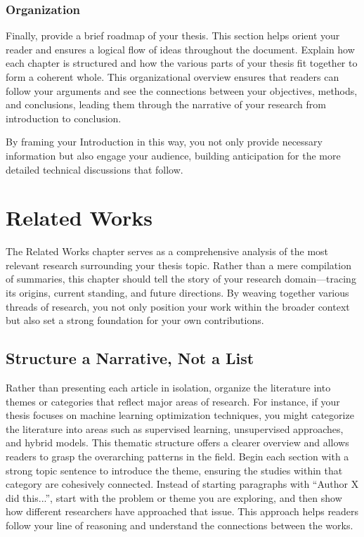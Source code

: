 \documentclass{iutbscthesis}
\begin{document}
\subsection{Organization}
Finally, provide a brief roadmap of your thesis. This section helps orient your reader and ensures a logical flow of ideas throughout the document. Explain how each chapter is structured and how the various parts of your thesis fit together to form a coherent whole. This organizational overview ensures that readers can follow your arguments and see the connections between your objectives, methods, and conclusions, leading them through the narrative of your research from introduction to conclusion.


By framing your Introduction in this way, you not only provide necessary information but also engage your audience, building anticipation for the more detailed technical discussions that follow.

\chapter{Related Works}
The Related Works chapter serves as a comprehensive analysis of the most relevant research surrounding your thesis topic. Rather than a mere compilation of summaries, this chapter should tell the story of your research domain—tracing its origins, current standing, and future directions. By weaving together various threads of research, you not only position your work within the broader context but also set a strong foundation for your own contributions.

\section{Structure a Narrative, Not a List}
Rather than presenting each article in isolation, organize the literature into themes or categories that reflect major areas of research. For instance, if your thesis focuses on machine learning optimization techniques, you might categorize the literature into areas such as supervised learning, unsupervised approaches, and hybrid models. This thematic structure offers a clearer overview and allows readers to grasp the overarching patterns in the field. Begin each section with a strong topic sentence to introduce the theme, ensuring the studies within that category are cohesively connected. Instead of starting paragraphs with ``Author X did this...'', start with the problem or theme you are exploring, and then show how different researchers have approached that issue. This approach helps readers follow your line of reasoning and understand the connections between the works.
\end{document}
